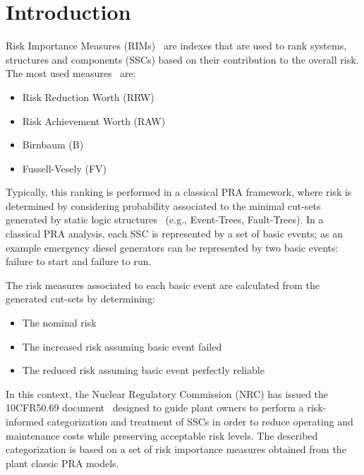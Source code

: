 \section{Introduction}
\label{sec:introduction}

Risk Importance Measures (RIMs)~\cite{Nureg3385} are indexes that are used to rank systems, structures and 
components (SSCs) based on their contribution to the overall risk. 
The most used measures~\cite{flemingRiskImportance} are: 
\begin{itemize}
  \item Risk Reduction Worth (RRW)
  \item Risk Achievement Worth (RAW)
  \item Birnbaum (B)
  \item Fussell-Vesely (FV)
\end{itemize}

Typically, this ranking is performed in a classical PRA framework, where risk is determined by 
considering probability associated to the minimal cut-sets generated by static logic 
structures~\cite{Nureg1150} (e.g., Event-Trees, Fault-Trees). In a classical PRA analysis, each SSC 
is represented by a set of basic events; as an example emergency diesel generators can be 
represented by two basic events: failure to start and failure to run. 

The risk measures associated to each basic event are calculated from the generated cut-sets 
by determining: 
\begin{itemize}
  \item The nominal risk 
  \item The increased risk assuming basic event failed
  \item The reduced risk assuming basic event perfectly reliable 
\end{itemize}

In this context, the Nuclear Regulatory Commission (NRC) has issued the 10CFR50.69 
document~\cite{} designed to guide plant owners to perform a risk-informed categorization and 
treatment of SSCs in order to reduce operating and maintenance costs while preserving 
acceptable risk levels. The described categorization is based on a set of risk importance 
measures obtained from the plant classic PRA models.

